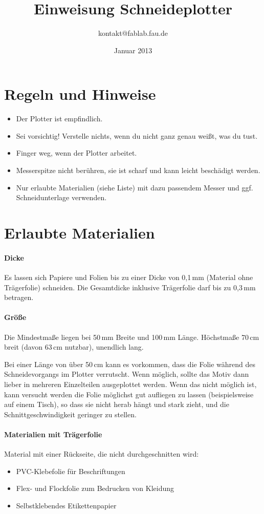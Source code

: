 \documentclass{\basedir/fablab-document}
\date{Januar 2013}
\author{kontakt@fablab.fau.de}
\title{Einweisung Schneideplotter}
\begin{document}
\maketitle
\section{Regeln und Hinweise}
\begin{itemize}
 \item Der Plotter ist empfindlich.
 \item Sei vorsichtig! Verstelle nichts, wenn du nicht ganz genau weißt, was du tust.
 \item Finger weg, wenn der Plotter arbeitet.
 \item Messerspitze nicht berühren, sie ist scharf und kann leicht beschädigt werden.
 \item Nur erlaubte Materialien (siehe Liste) mit dazu passendem Messer und ggf. Schneidunterlage verwenden.
\end{itemize}

\section{Erlaubte Materialien}
\paragraph{Dicke}
Es lassen sich Papiere und Folien bis zu einer Dicke von 0,1\,mm (Material ohne Trägerfolie) schneiden.
Die Gesamtdicke inklusive Trägerfolie darf bis zu 0,3\,mm betragen.

\paragraph{Größe}
Die Mindestmaße liegen bei 50\,mm Breite und 100\,mm Länge.
Höchstmaße 70\,cm breit (davon 63\,cm nutzbar), unendlich lang.

Bei einer Länge von über 50\,cm kann es vorkommen, dass die Folie während des Schneidevorgangs im Plotter verrutscht.
Wenn möglich, sollte das Motiv dann lieber in mehreren Einzelteilen ausgeplottet werden.
Wenn das nicht möglich ist, kann versucht werden die Folie möglichst gut aufliegen zu lassen (beispielsweise auf einem Tisch), so dass sie nicht herab hängt und stark zieht, und die Schnittgeschwindigkeit geringer zu stellen.


\paragraph{Materialien mit Trägerfolie}
Material mit einer Rückseite, die nicht durchgeschnitten wird:
\begin{itemize}
 \item PVC-Klebefolie für Beschriftungen
 \item Flex- und Flockfolie zum Bedrucken von Kleidung
 \item Selbstklebendes Etikettenpapier
\end{itemize}
\end{document}
